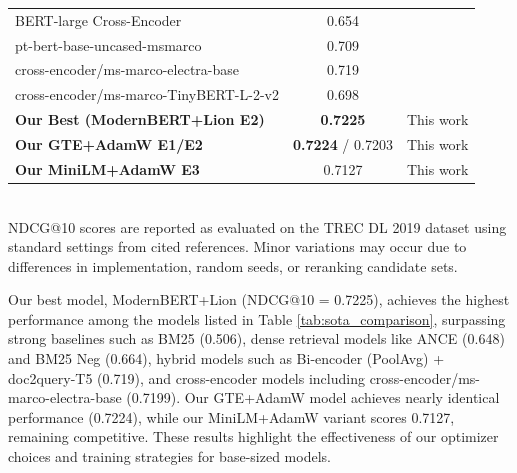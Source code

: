 \documentclass[conference]{IEEEtran}
\begin{document}
\begin{table}[htbp]
\begin{tabular}{l c c}
BERT-large Cross-Encoder & 0.654 & \cite{Lin2021PretrainedTF} \\
pt-bert-base-uncased-msmarco & 0.709 & \cite{koursaros2019NBoost} \\
cross-encoder/ms-marco-electra-base & 0.719 & \cite{reimers2019sentence} \\
cross-encoder/ms-marco-TinyBERT-L-2-v2 & 0.698 & \cite{reimers2019sentence} \\
\midrule
\textbf{Our Best (ModernBERT+Lion E2)} & \textbf{0.7225} & This work \\
\textbf{Our GTE+AdamW E1/E2} & \textbf{0.7224} / 0.7203 & This work \\
\textbf{Our MiniLM+AdamW E3} & 0.7127 & This work \\
\bottomrule
\end{tabular}
\vspace{1em}\\
\footnotesize{NDCG@10 scores are reported as evaluated on the TREC DL 2019 dataset using standard settings from cited references. Minor variations may occur due to differences in implementation, random seeds, or reranking candidate sets.}
\end{table}

Our best model, ModernBERT+Lion (NDCG@10 = 0.7225), achieves the highest performance among the models listed in Table \ref{tab:sota_comparison}, surpassing strong baselines such as BM25 (0.506), dense retrieval models like ANCE (0.648) and BM25 Neg (0.664), hybrid models such as Bi-encoder (PoolAvg) + doc2query-T5 (0.719), and cross-encoder models including cross-encoder/ms-marco-electra-base (0.7199). Our GTE+AdamW model achieves nearly identical performance (0.7224), while our MiniLM+AdamW variant scores 0.7127, remaining competitive. These results highlight the effectiveness of our optimizer choices and training strategies for base-sized models.
\end{document}
